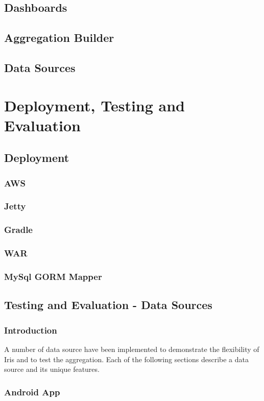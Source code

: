 \documentclass[12pt,a4paper,titlepage]{report}
\begin{document}
\section{Dashboards}
\section{Aggregation Builder}
\section{Data Sources}

\chapter{Deployment, Testing and Evaluation}

\section{Deployment}
\subsection{AWS}
\subsection{Jetty}
\subsection{Gradle}
\subsection{WAR}
\subsection{MySql GORM Mapper}

\section{Testing and Evaluation - Data Sources}
\subsection{Introduction}
A number of data source have been implemented to demonstrate the flexibility of Iris and to test the aggregation. Each
of the following sections describe a data source and its unique features.

\subsection{Android App}
\end{document}
